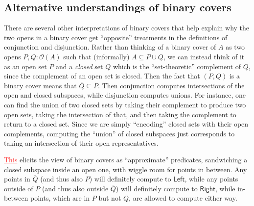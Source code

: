 \documentclass[conference]{IEEEtran}
\newcommand{\Open}[1]{\mathcal{O}({#1})}
\newcommand{\grammar}[1]{\textcolor{red}{\underline{#1}}}
\begin{document}
\subsection{Alternative understandings of binary covers}

There are several other interpretations of binary covers that help explain why the two opens in a binary cover get ``opposite'' treatments in the definitions of conjunction and disjunction. Rather than thinking of a binary cover of $A$ as two opens $P, Q : \Open{A}$ such that (informally) $A \subseteq P \cup Q$, we can instead think of it as an open set $P$ and a \emph{closed} set $\overline{Q}$ which is the ``set-theoretic'' complement of $Q$, since the complement of an open set is closed. Then the fact that $(P, Q)$ is a binary cover means that $\overline{Q} \subseteq P$. Then conjunction computes intersections of the open and closed subspaces, while disjunction computes unions.
For instance, one can find the union of two closed sets by taking their complement to produce two open sets, taking the intersection of that, and then taking the complement to return to a closed set. Since we are simply ``encoding'' closed sets with their open complements, computing the ``union'' of closed subspaces just corresponds to taking an intersection of their open representatives.

\grammar{This} elicits the view of binary covers as ``approximate'' predicates, sandwiching a closed subspace inside an open one, with wiggle room for points in between. Any points in $\overline{Q}$ (and thus also $P$) will definitely compute to $\mathsf{Left}$, while any points outside of $P$ (and thus also outside $\overline{Q}$) will definitely compute to $\mathsf{Right}$, while in-between points, which are in $P$ but not $\overline{Q}$, are allowed to compute either way.
\end{document}
